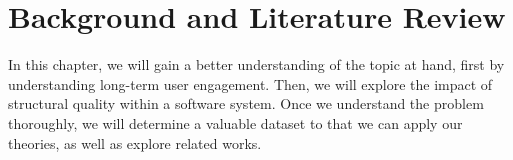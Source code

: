 \chapter{Background and Literature Review} \label{chapterBackground}





In this chapter, we will gain a better understanding of the topic at hand, first by understanding long-term user engagement. Then, we will explore the impact of structural quality within a software system. Once we understand the problem thoroughly, we will determine a valuable dataset to that we can apply our theories, as well as explore related works.
